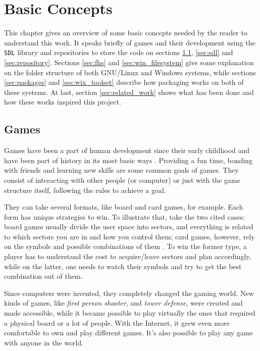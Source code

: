 \chapter{Basic Concepts}
\label {sec:basic_concepts}

This chapter gives an overview of some basic concepts needed by the reader to understand this work. It speaks briefly of games and their development using the \texttt{SDL} library and repositories to store the code on sections \ref{sec:games}, \ref{sec:sdl} and \ref{sec:repository}. Sections \ref{sec:fhs} and \ref{sec:win_filesystem} give some explanation on the folder structure of both GNU/Linux and Windows systems, while sections \ref{sec:packages} and \ref{sec:wix_toolset} describe how packaging works on both of these systems. At last, section \ref{sec:related_work} shows what has been done and how these works inspired this project.

\section{Games}
\label {sec:games}

Games have been a part of human development since their early childhood and have been part of history in its most basic ways \cite{bethke2003game}. Providing a fun time, bonding with friends and learning new skills are some common goals of games. They consist of interacting with other people (or computer) or just with the game structure itself, following the rules to achieve a goal.

They can take several formats, like board and card games, for example. Each form has unique strategies to win. To illustrate that, take the two cited cases: board games usually divide the user space into sectors, and everything is related to which sectors you are in and how you control them; card games, however, rely on the symbols and possible combinations of them \cite{crawford1984art}. To win the former type, a player has to understand the cost to acquire/leave sectors and plan accordingly, while on the latter, one needs to watch their symbols and try to get the best combination out of them.

Since computers were invented, they completely changed the gaming world. New kinds of games, like \textit{first person shooter}, and \textit{tower defense}, were created and made accessible, while it became possible to play virtually the ones that required a physical board or a lot of people. With the Internet, it grew even more comfortable to own and play different games. It's also possible to play any game with anyone in the world.

